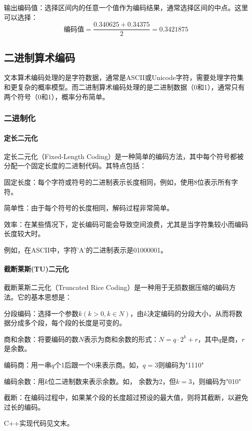 \documentclass{/Users/hi/Study/template/code}
\begin{document}
\begin{tcolorbox}
\begin{serialNumber}
		\item 输出编码值：选择区间内的任意一个值作为编码结果，通常选择区间的中点。这里可以选择：
		\begin{equation}
			\text{编码值} = \frac{0.340625 + 0.34375}{2} = 0.3421875
		\end{equation}
	\end{serialNumber}
\end{tcolorbox}


\subsection{二进制算术编码}
文本算术编码处理的是字符数据，通常是ASCII或Unicode字符，需要处理字符集和更复杂的概率模型。而二进制算术编码处理的是二进制数据（0和1），通常只有两个符号（0和1），概率分布简单。

\subsubsection{二进制化}
\paragraph{定长二元化}
定长二元化（Fixed-Length Coding）是一种简单的编码方法，其中每个符号都被分配一个固定长度的二进制代码。其特点包括：

固定长度：每个字符或符号的二进制表示长度相同，例如，使用8位表示所有字符。

简单性：由于每个符号的长度相同，解码过程非常简单。

效率：在某些情况下，定长编码可能会导致空间浪费，尤其是当字符集较小而编码长度较大时。

例如，在ASCII中，字符'A'的二进制表示是01000001。


\paragraph{截断莱斯(TU)二元化}
截断莱斯二元化（Truncated Rice Coding）是一种用于无损数据压缩的编码方法。它的基本思想是：
\begin{serialNumber}
	\item 分段编码：选择一个参数$k ( k > 0 , k \in N )$，由$k$决定编码的分段大小，从而将数据分成多个段，每个段的长度是可变的。
	\item 商和余数：将要编码的数$ N $表示为商和余数的形式：\( N = q \cdot 2^k + r \)，其中\( q \)是商，\( r \)是余数。
	\item 编码商：用一串\( q \)个1后跟一个0来表示商。如，$q = 3$则编码为"1110"
	\item 编码余数：用\( k \)位二进制数来表示余数。如， 余数为2，但$k = 3$，则编码为"010"
	\item 截断：在编码过程中，如果某个段的长度超过预设的最大值，则将其截断，以避免过长的编码。
\end{serialNumber}
C++实现代码见文末。
\end{document}
